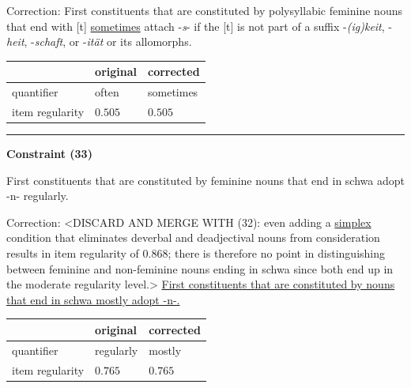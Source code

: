 \noindent
Correction: First constituents that are constituted by polysyllabic feminine nouns that end with [t] \underline{sometimes} attach -\textit{s}- if the [t] is not part of a suffix -\textit{(ig)keit}, -\textit{heit}, -\textit{schaft}, or -\textit{ität} or its allomorphs.

\vspace{-0.25em}

\begin{table}[!ht]

\begin{center}

\begin{tabularx}{\columnwidth}{|X|X|X|}
      \hline
                        & original      & corrected \\
      \hline
      quantifier        & often      & sometimes   \\
      \hline
      item regularity   & $0.505$      & $0.505$   \\
      \hline
\end{tabularx}
\end{center}
\end{table}

\vspace{-0.75em}
\hrule




\vspace{0.6em}

\begin{center}
\textbf{Constraint (33)}
\end{center}

\noindent
First constituents that are constituted by feminine nouns that end in schwa adopt -n- regularly.
\vspace{0.3em}

\noindent
Correction: <DISCARD AND MERGE WITH (32): even adding a \underline{simplex} condition that eliminates deverbal and deadjectival nouns from consideration results in item regularity of $0.868$; there is therefore no point in distinguishing between feminine and non-feminine nouns ending in schwa since both end up in the moderate regularity level.> \underline{First constituents that are constituted by nouns} \underline{that end in schwa mostly adopt -n-.}

\vspace{-0.25em}

\begin{table}[!ht]

\begin{center}

\begin{tabularx}{\columnwidth}{|X|X|X|}
      \hline
                        & original      & corrected \\
      \hline
      quantifier        & regularly      & mostly   \\
      \hline
      item regularity   & $0.765$      & $0.765$   \\
      \hline
\end{tabularx}
\end{center}
\end{table}

